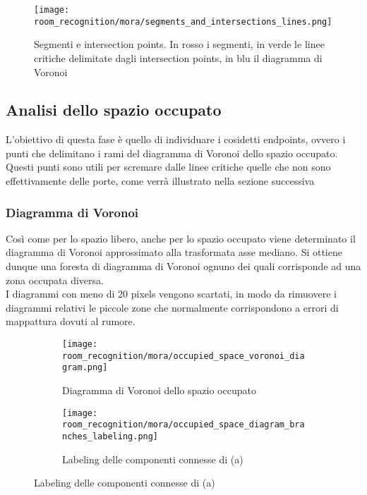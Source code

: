 \begin{figure}[H]
  \centering
  \texttt{[image: room\_recognition/mora/segments\_and\_intersections\_lines.png]}
  \caption{Segmenti e intersection points. In rosso i segmenti, in verde le linee critiche delimitate dagli intersection points, in blu il diagramma di Voronoi}
\end{figure}
\subsection{Analisi dello spazio occupato}
L'obiettivo di questa fase è quello di individuare i cosidetti endpoints, ovvero i punti che delimitano i rami del diagramma di Voronoi dello spazio occupato. Questi punti sono utili per scremare dalle linee critiche quelle che non sono effettivamente delle porte, come verrà illustrato nella sezione successiva
\subsubsection{Diagramma di Voronoi}
Così come per lo spazio libero, anche per lo spazio occupato viene determinato il diagramma di Voronoi approssimato alla trasformata asse mediano. Si ottiene dunque una foresta di diagramma di Voronoi ognuno dei quali corrisponde ad una zona occupata diversa. \\
I diagrammi con meno di 20 pixels vengono scartati, in modo da rimuovere i diagrammi relativi le piccole zone che normalmente corrispondono a errori di mappattura dovuti al rumore.

\begin{figure}
  \centering
  \begin{subfigure}[t]{0.45\textwidth}
    \centering
    \texttt{[image: room\_recognition/mora/occupied\_space\_voronoi\_diagram.png]}
    \caption{Diagramma di Voronoi dello spazio occupato}
  \end{subfigure}
  \begin{subfigure}[t]{0.45\textwidth}
    \centering
    \texttt{[image: room\_recognition/mora/occupied\_space\_diagram\_branches\_labeling.png]}
    \caption{Labeling delle componenti connesse di (a)}
  \end{subfigure}
\end{figure}

